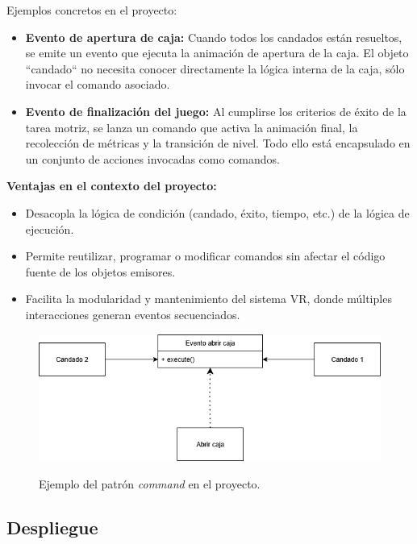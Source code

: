 Ejemplos concretos en el proyecto:
\begin{itemize}
    \item \textbf{Evento de apertura de caja:} Cuando todos los candados están resueltos, se emite un evento que ejecuta la animación de apertura de la caja. El objeto ``candado`` no necesita conocer directamente la lógica interna de la caja, sólo invocar el comando asociado.
    
    \item \textbf{Evento de finalización del juego:} Al cumplirse los criterios de éxito de la tarea motriz, se lanza un comando que activa la animación final, la recolección de métricas y la transición de nivel. Todo ello está encapsulado en un conjunto de acciones invocadas como comandos.
\end{itemize}

\textbf{Ventajas en el contexto del proyecto:}
\begin{itemize}
    \item Desacopla la lógica de condición (candado, éxito, tiempo, etc.) de la lógica de ejecución.
    \item Permite reutilizar, programar o modificar comandos sin afectar el código fuente de los objetos emisores.
    \item Facilita la modularidad y mantenimiento del sistema VR, donde múltiples interacciones generan eventos secuenciados.
\end{itemize}

\begin{figure}[h]
	\caption[Ejemplo de command]{Ejemplo del patrón \textit{command} en el proyecto.}
	\centering
	\includegraphics[width=\textwidth]{../img/anexos/ejemplo_patron_command.png}
	\label{b:ejemplo_command}
\end{figure}


\subsection*{Despliegue}


